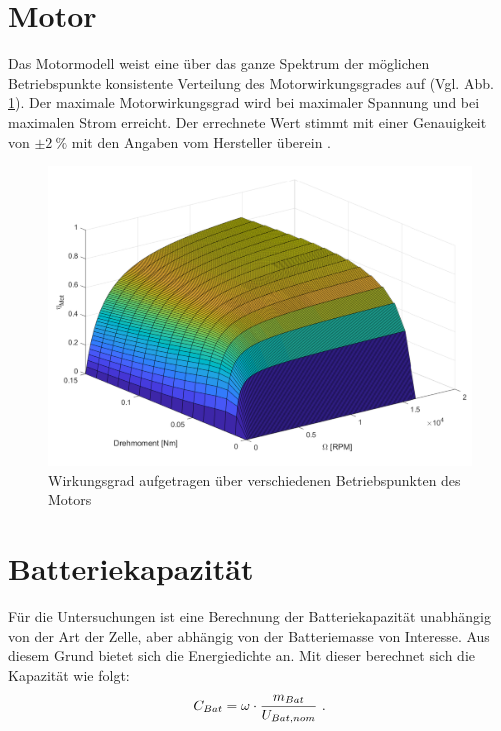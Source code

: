 \begin{appendix}
\section{Motor}
\label{sec:motormodell}
Das Motormodell weist eine über das ganze Spektrum der möglichen Betriebspunkte konsistente Verteilung des Motorwirkungsgrades auf (Vgl. Abb. \ref{abb:motormodell}). Der maximale Motorwirkungsgrad wird bei maximaler Spannung und bei maximalen Strom erreicht. Der errechnete Wert stimmt mit einer Genauigkeit von \ensuremath{\pm \SI{2}{\%}} mit den Angaben vom Hersteller überein \cite{axi}.
\begin{figure}[H]
\centering
	\includegraphics[scale=0.7]{Diagramme/Motormodell.pdf}
	\caption{Wirkungsgrad aufgetragen über verschiedenen Betriebspunkten des Motors}
	\label{abb:motormodell}
\end{figure}

\section{Batteriekapazität}
Für die Untersuchungen ist eine Berechnung der Batteriekapazität unabhängig von der Art der Zelle, aber abhängig von der Batteriemasse von Interesse.
Aus diesem Grund bietet sich die Energiedichte an. 
Mit dieser berechnet sich die Kapazität wie folgt:
\begin{equation}
	C_{Bat}	= \omega\cdot\frac{m_{Bat}}{U_{Bat,nom}} ~\text{.}
	\label{eq:batteriekapazitaet}
\end{equation}



\end{appendix}
